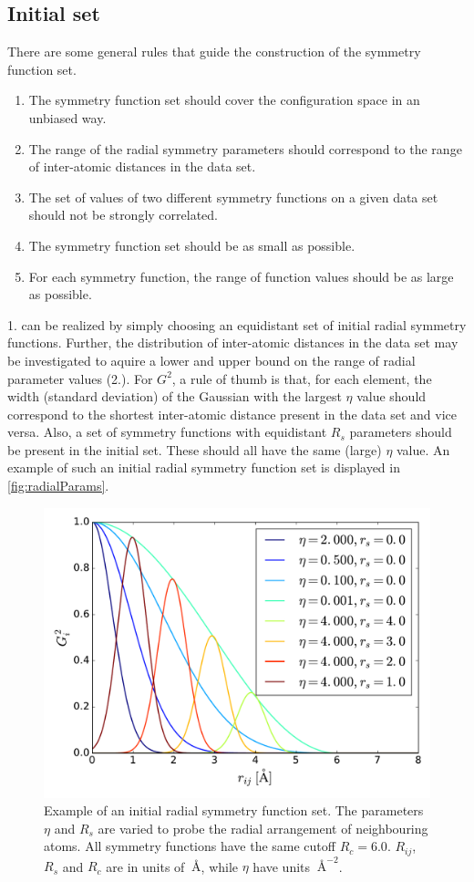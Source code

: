 \documentclass[twoside,english]{uiofysmaster}
\begin{document}
\subsection{Initial set}
There are some general rules that guide the construction of the symmetry function set. \cite{Behler15}
\begin{enumerate}
 \item The symmetry function set should cover the configuration space in an unbiased way. 
 \item The range of the radial symmetry parameters should correspond to the range of inter-atomic distances in the data set.
 \item The set of values of two different symmetry functions on a given data set should not be strongly correlated. 
 \item The symmetry function set should be as small as possible.
 \item For each symmetry function, the range of function values should be as large as possible.   
\end{enumerate}
1. can be realized by simply choosing an equidistant set of initial radial symmetry functions.
Further, the distribution of inter-atomic distances in the data set may be investigated to aquire a 
lower and upper bound on the range of radial parameter values (2.). For $G^2$, a rule of thumb is that, for each element, 
the width (standard deviation) of the Gaussian
with the largest $\eta$ value should correspond to the shortest inter-atomic distance present in the data set 
and vice versa. Also, a set of symmetry functions with equidistant $R_s$ parameters should be present in the initial set.
These should all have the same (large) $\eta$ value. An example of such an initial radial symmetry function set is displayed
in \autoref{fig:radialParams}. 
\begin{figure}
\centering
  \includegraphics[width = 0.7\linewidth]{Figures/Implementation/radialParams.pdf}
  \caption{Example of an initial radial symmetry function set. The parameters $\eta$ and $R_s$ are varied to 
  probe the radial arrangement of neighbouring atoms.
  All symmetry functions have the same cutoff $R_c = 6.0$. 
  $R_{ij}$, $R_s$ and $R_c$ are in units of $\SI{}{\angstrom}$, while $\eta$ have units $\SI{}{\angstrom}^{-2}$.}
  \label{fig:radialParams}
\end{figure}
\end{document}
